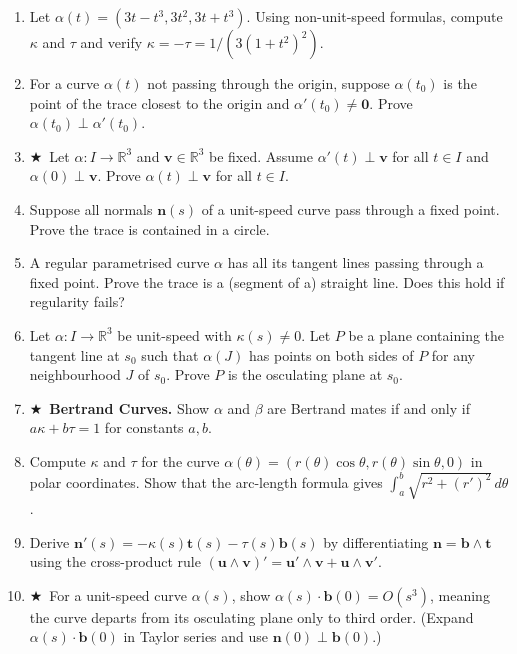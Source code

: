 \documentclass[11pt, a4paper]{article}
\newcommand{\R}{\mathbb{R}}
\newcommand{\mbf}[1]{\mathbf{#1}}
\newcommand{\kp}{\kappa}
\newcommand{\tp}{\tau}
\newcommand{\hard}{$\bigstar$\ }
\begin{document}
\begin{enumerate}[label=\textbf{Q\arabic*.}, leftmargin=*, itemsep=6pt]
\item Let $\alpha(t)=(3t-t^3,3t^2,3t+t^3)$. Using non-unit-speed formulas, compute $\kp$ and $\tp$ and verify $\kp=-\tp=1/(3(1+t^2)^2)$.

\item For a curve $\alpha(t)$ not passing through the origin, suppose $\alpha(t_0)$ is the point of the trace closest to the origin and $\alpha'(t_0)\neq\mathbf{0}$. Prove $\alpha(t_0)\perp\alpha'(t_0)$.

\item \hard Let $\alpha:I\to\R^3$ and $\mathbf{v}\in\R^3$ be fixed. Assume $\alpha'(t)\perp\mathbf{v}$ for all $t\in I$ and $\alpha(0)\perp\mathbf{v}$. Prove $\alpha(t)\perp\mathbf{v}$ for all $t\in I$.

\item Suppose all normals $\mbf{n}(s)$ of a unit-speed curve pass through a fixed point. Prove the trace is contained in a circle.

\item A regular parametrised curve $\alpha$ has all its tangent lines passing through a fixed point. Prove the trace is a (segment of a) straight line. Does this hold if regularity fails?

\item Let $\alpha:I\to\R^3$ be unit-speed with $\kp(s)\neq 0$. Let $P$ be a plane containing the tangent line at $s_0$ such that $\alpha(J)$ has points on both sides of $P$ for any neighbourhood $J$ of $s_0$. Prove $P$ is the osculating plane at $s_0$.

\item \hard \textbf{Bertrand Curves.} Show $\alpha$ and $\beta$ are Bertrand mates if and only if $a\kp+b\tp=1$ for constants $a,b$.

\item Compute $\kp$ and $\tp$ for the curve $\alpha(\theta)=(r(\theta)\cos\theta, r(\theta)\sin\theta, 0)$ in polar coordinates. Show that the arc-length formula gives $\int_a^b\sqrt{r^2+(r')^2}\,d\theta$.

\item Derive $\mbf{n}'(s)=-\kp(s)\mbf{t}(s)-\tp(s)\mbf{b}(s)$ by differentiating $\mbf{n}=\mbf{b}\wedge\mbf{t}$ using the cross-product rule $(\mbf{u}\wedge\mbf{v})'=\mbf{u}'\wedge\mbf{v}+\mbf{u}\wedge\mbf{v}'$.

\item \hard For a unit-speed curve $\alpha(s)$, show $\alpha(s)\cdot\mbf{b}(0)=O(s^3)$, meaning the curve departs from its osculating plane only to third order. (Expand $\alpha(s)\cdot\mbf{b}(0)$ in Taylor series and use $\mbf{n}(0)\perp\mbf{b}(0)$.)


\end{enumerate}
\end{document}
